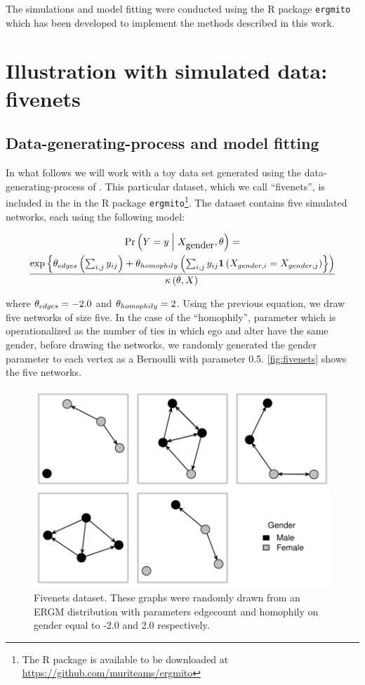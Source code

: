 \documentclass[12pt]{article}
\begin{document}
The simulations and model fitting were conducted using the R package \texttt{ergmito} which has been developed to implement the methods described in this work.

\section{Illustration with simulated data: fivenets}

\subsection{Data-generating-process and model fitting}

In what follows we will work with a toy data set generated using the data-generating-process of \ergmitos{}. This particular dataset, which we call ``fivenets'', is included in the in the R package \texttt{ergmito}\footnote{The R package is available to be downloaded at  \url{https://github.com/muriteams/ergmito}}. The dataset contains five simulated networks, each using the following model:

\begin{multline*}
\Prcond{\Adjmat = \adjmat}{\Indepvar_{\mbox{gender}}, \params} = \\
\frac{ %
    \exp{\params_{edges}\left(\sum_{i,j} \adjmat_{ij}\right) + %
    \params_{homophily}\left(\sum_{i,j} \adjmat_{ij}\isone{\Indepvar_{gender, i} = \Indepvar_{gender, j}}}\right) %
    }{%
    \normconst{}
    }
\end{multline*}

\noindent where $\theta_{edges} = -2.0$ and $\theta_{homophily} = 2$. Using the previous equation, we draw five networks of size five. In the case of the ``homophily'', parameter which is operationalized as the number of ties in which ego and alter have the same gender, before drawing the networks, we randomly generated the gender parameter to each vertex as a Bernoulli with parameter 0.5. \autoref{fig:fivenets} shows the five networks.

\begin{figure}[tb]
    \centering
    \includegraphics[width=.6\linewidth]{figures/fivenets_graphs.pdf}
    \caption{\label{fig:fivenets}Fivenets dataset. These graphs were randomly drawn from an ERGM distribution with parameters edgecount and homophily on gender equal to -2.0 and 2.0 respectively.}
    \label{fig:my_label}
\end{figure}
\end{document}

